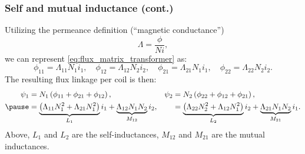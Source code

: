 \begin{frame}
	\frametitle{Self and mutual inductance (cont.)}
    Utilizing the permeance definition (``magnetic conductance'') 
    \begin{equation}
        \Lambda = \frac{\phi}{N i},
    \end{equation}
    \pause
    we can represent \eqref{eq:flux_matrix_transformer} as:
    \begin{equation}
        \phi_{11} = \Lambda_{11} N_1 i_1, \quad \phi_{12} = \Lambda_{12} N_2 i_2, \quad \phi_{21} = \Lambda_{21} N_1 i_1, \quad \phi_{22} = \Lambda_{22} N_2 i_2.
    \end{equation}
    \pause
    The resulting flux linkage per coil is then:
    \begin{equation}
        \begin{alignedat}{3}
        \psi_1 &= N_1\left(\phi_{11} + \phi_{21} + \phi_{12}\right), \quad && \psi_2 && =  N_2\left(\phi_{22} + \phi_{12} + \phi_{21}\right),\\ \pause
               &=\underbrace{\left(\Lambda_{11}N_1^2+\Lambda_{21}N_1^2\right)}_{L_1}i_1 + \underbrace{\Lambda_{12}N_1N_2}_{M_{12}}i_2, \quad && && =\underbrace{\left(\Lambda_{22}N_2^2+\Lambda_{12}N_1^2\right)}_{L_2}i_2 + \underbrace{\Lambda_{21}N_1N_2}_{M_{21}}i_1. 
        \end{alignedat}
        \label{eq:flux_linkage_transformer}
    \end{equation}
    Above, $L_1$ and $L_2$ are the self-inductances, $M_{12}$ and $M_{21}$ are the mutual inductances.
\end{frame}

